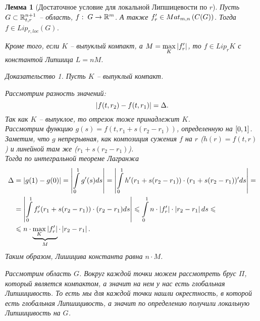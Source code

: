 \documentclass[a5paper, 10pt]{article}
\theoremstyle{definition}
\theoremstyle{plain}
\newtheorem{Lem}{Лемма}
\theoremstyle{remark}
\newtheorem*{Proof}{Доказательство}
\begin{document}
	\begin{Lem}[Достаточное условие для локальной Липшицевости по $r$]
		Пусть $G \subset \mathbb{R}^{n+1}_{t,r}$ -- область, $f: \; G \rightarrow \mathbb{R}^m$. А также $f'_r \in Mat_{m,n}\left(C(G)\right)$. Тогда $f\in Lip_{r,loc}(G)$.
		
		Кроме того, если $K$ -- выпуклый компакт, а $M = \max\limits_K \left|f'_r\right|$, то $f\in Lip_rK$ с константой Липшица $L=nM$.
		
		\begin{Proof}
			Пусть $K$ -- выпуклый компакт.
			\begin{figure}[h!]
				\centering
			\end{figure}
		
		Рассмотрим разность значений:
		\[
		\left|f(t,r_2) - f(t,r_1)\right| = \Delta.
		\]
		Так как $K$ -- выпуклое, то отрезок тоже принадлежит $K$.\\
		Рассмотрим функцию $g(s) = f(t, r_1 + s(r_2-r_1))$, определенную на $\left[0,1\right]$. Заметим, что $g$ непрерывная, как композиция сужения $f$ на $r$ ($h(r) = f(t,r)$) и линейной там же ($r_1 + s(r_2-r_1)$).\\
		Тогда по интегральной теореме Лагранжа
		\[
		\begin{split}
		\Delta &= \left|g(1) - g(0)\right| = \left|\int\limits_0^1 g'(s) ds\right| = \left|\int\limits_0^1 h'(r_1 + s(r_2-r_1))\cdot(r_1 + s(r_2-r_1))' ds\right| =\\
		&= \left|\int\limits_0^1 f'_r (r_1 + s(r_2-r_1)) \cdot (r_2-r_1) ds\right| \leqslant \int\limits_0^1 n \cdot \left|f'_r\right| \cdot \left|r_2-r_1\right| ds \leqslant\\
		&\leqslant n \cdot \underbrace{\max\limits_K \left|f'_r\right|}_{M} \cdot \left|r_2-r_1\right|. 
		\end{split}
		\]
		Таким образом, Лишицива константа равна $n\cdot M$.
		
		Рассмотрим область $G$. Вокруг каждой точки можем рассмотреть брус $\Pi$, который является компактом, а значит на нем у нас есть глобальная Липшицивость. То есть мы для каждой точки нашли окрестность, в которой есть глобальная Липшицивость, а значит по определению получили локальную Липшицивость на $G$.
		\end{Proof}
	\end{Lem}
\end{document}
